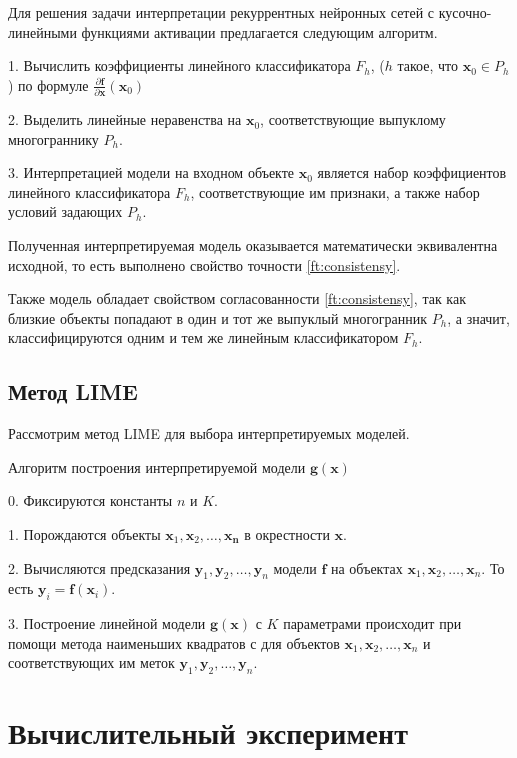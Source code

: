\documentclass[a4paper, 12pt]{article}
\begin{document}
Для решения задачи интерпретации рекуррентных нейронных сетей с кусочно-линейными функциями активации предлагается следующим алгоритм.

1. Вычислить коэффициенты линейного классификатора $F_h$, ($h$ такое, что $\mathbf{x}_0\in P_h$) по формуле $\frac{\partial\mathbf{f}}{\partial\mathbf{x}}(\mathbf{x}_0)$

2. Выделить линейные неравенства на $\mathbf{x}_0$, соответствующие выпуклому многограннику $P_h$.

3. Интерпретацией модели на входном объекте $\mathbf{x}_0$ является набор коэффициентов линейного классификатора $F_h$, соответствующие им признаки, а также набор условий задающих $P_h$.

Полученная интерпретируемая модель оказывается математически эквивалентна исходной, то есть выполнено свойство точности \eqref{ft:consistensy}.

Также модель обладает свойством согласованности \eqref{ft:consistensy}, так как близкие объекты попадают в один и тот же выпуклый многогранник $P_h$, а значит, классифицируются одним и тем же линейным классификатором $F_h$.

\subsection{Метод LIME}

Рассмотрим метод LIME \cite{ribeiro2016why} для выбора интерпретируемых моделей.

Алгоритм построения интерпретируемой модели $\mathbf{g}(\mathbf{x})$

0. Фиксируются константы $n$ и $K$.

1. Порождаются объекты $\mathbf{x}_1, \mathbf{x}_2, \dots, \mathbf{x_n}$ в окрестности $\mathbf{x}$.

2. Вычисляются предсказания $\mathbf{y}_1, \mathbf{y}_2, \dots, \mathbf{y}_n$ модели $\mathbf{f}$ на объектах $\mathbf{x}_1, \mathbf{x}_2, \dots, \mathbf{x}_n$. То есть $\mathbf{y}_i=\mathbf{f}(\mathbf{x}_i)$.

3. Построение линейной модели $\mathbf{g}(\mathbf{x})$ с $K$ параметрами происходит при помощи метода наименьших квадратов с для объектов $\mathbf{x}_1, \mathbf{x}_2, \dots, \mathbf{x}_n$ и соответствующих им меток $\mathbf{y}_1, \mathbf{y}_2, \dots, \mathbf{y}_n$.  

\section{Вычислительный эксперимент}
\end{document}
